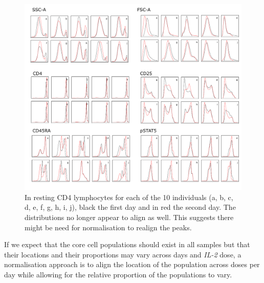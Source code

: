 \begin{figure}[h]
    \centering
    \includegraphics[scale=.75]{IL2/figures/channels-days.pdf}
    \caption{  \label{figure:channels-days} 
    In resting CD4 lymphocytes for each of the 10 individuals (a, b, c, d, e, f, g, h, i, j), black the first day and in red the second day.
    The distributions no longer appear to align as well. This suggests there might be need for normalisation to realign the peaks.}
\end{figure}


If we expect that the core cell populations should exist in all samples but that their locations and their
proportions may vary across days and \emph{IL-2} dose, 
a normalisation approach is to align the location of the population across doses per day while allowing for the relative proportion of the populations to vary.

